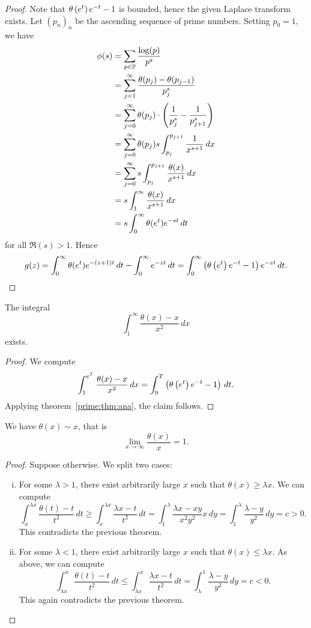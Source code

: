 \begin{proof}
Note that $\theta \left(e^t\right) e^{-t} - 1$ is bounded, hence the
given Laplace transform exists. Let $(p_n)_n$ be the ascending
sequence of prime numbers. Setting $p_0 = 1$, we have
\begin{align*}
\phi(s) &=
\sum_{p \in \mathbb{P}} \frac{\log(p)}{p^s}
\\
&=
\sum_{j=1}^\infty \frac{\theta(p_j) - \theta(p_{j-1})}{p_j^s}
\\
&=
\sum_{j=0}^\infty \theta(p_j) \cdot
\left(\frac{1}{p_j^s} - \frac{1}{p_{j+1}^s}\right)
\\
&=
\sum_{j=0}^\infty \theta(p_j) s
\int_{p_j}^{p_{j+1}} \frac{1}{x^{s+1}}\,dx
\\
&=
\sum_{j=0}^\infty s
\int_{p_j}^{p_{j+1}} \frac{\theta(x)}{x^{s+1}}\,dx
\\
&=
s \int_1^\infty \frac{\theta(x)}{x^{s+1}}\,dx
\\
&=
s \int_0^\infty \theta(e^t) e^{-st}\,dt
\end{align*}
for all $\Re(s) > 1$. Hence
\[
g(z) =
\int_0^\infty \theta(e^t) e^{-(z+1)t}\,dt -
\int_0^\infty e^{-zt}\,dt =
\int_0^\infty \left(\theta \left(e^t\right) e^{-t} - 1\right) e^{-zt}\,dt. \qedhere
\]
\end{proof}

\begin{izrek}
The integral
\[
\int_1^\infty \frac{\theta(x) - x}{x^2}\,dx
\]
exists.
\end{izrek}

\begin{proof}
We compute
\[
\int_1^{e^T} \frac{\theta(x) - x}{x^2}\,dx =
\int_0^T \left(\theta \left(e^t\right) e^{-t} - 1\right)\,dt.
\]
Applying theorem~\ref{prime:thm:ana}, the claim follows.
\end{proof}

\begin{izrek}
We have $\theta(x) \sim x$, that is
\[
\lim_{x \to \infty} \frac{\theta(x)}{x} = 1.
\]
\end{izrek}

\begin{proof}
Suppose otherwise. We split two cases:

\begin{enumerate}[i)]
\item For some $\lambda > 1$, there exist arbitrarily large $x$
such that $\theta(x) \geq \lambda x$. We can compute
\[
\int_x^{\lambda x} \frac{\theta(t) - t}{t^2}\,dt \geq
\int_x^{\lambda x} \frac{\lambda x - t}{t^2}\,dt =
\int_1^\lambda \frac{\lambda x - xy}{x^2 y^2} x\,dy =
\int_1^\lambda \frac{\lambda - y}{y^2}\,dy =
c >
0.
\]
This contradicts the previous theorem.
\item For some $\lambda < 1$, there exist arbitrarily large $x$
such that $\theta(x) \leq \lambda x$. As above, we can compute
\[
\int_{\lambda x}^x \frac{\theta(t) - t}{t^2}\,dt \leq
\int_{\lambda x}^x \frac{\lambda x - t}{t^2}\,dt =
\int_\lambda^1 \frac{\lambda - y}{y^2}\,dy =
c <
0.
\]
This again contradicts the previous theorem. \qedhere
\end{enumerate}
\end{proof}

